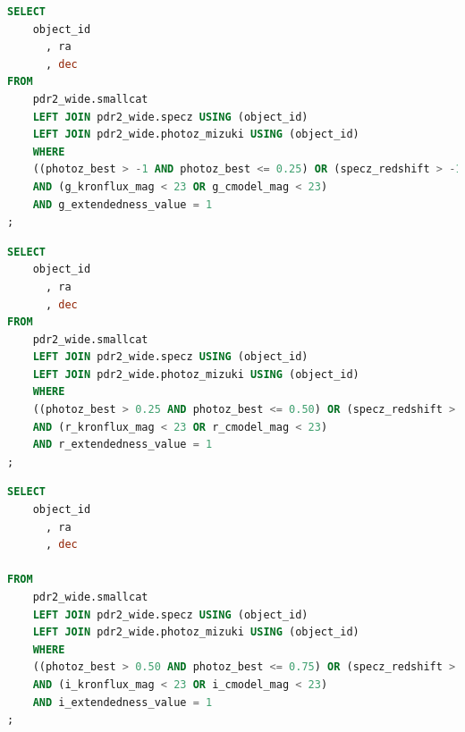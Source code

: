 \begin{lstlisting}[language=SQL, 
    caption={Low-z Sample SQL query}, 
    label={code:sql_low_z}]
SELECT
    object_id
      , ra
      , dec
FROM
    pdr2_wide.smallcat
    LEFT JOIN pdr2_wide.specz USING (object_id)
    LEFT JOIN pdr2_wide.photoz_mizuki USING (object_id)
    WHERE
    ((photoz_best > -1 AND photoz_best <= 0.25) OR (specz_redshift > -1 AND specz_redshift <= 0.25))
    AND (g_kronflux_mag < 23 OR g_cmodel_mag < 23)
    AND g_extendedness_value = 1
;
\end{lstlisting}

\begin{lstlisting}[language=SQL, 
    caption={Mid-z Sample SQL query}, 
    label={code:sql_mid_z}]
SELECT
    object_id
      , ra
      , dec
FROM
    pdr2_wide.smallcat
    LEFT JOIN pdr2_wide.specz USING (object_id)
    LEFT JOIN pdr2_wide.photoz_mizuki USING (object_id)
    WHERE
    ((photoz_best > 0.25 AND photoz_best <= 0.50) OR (specz_redshift > 0.25 AND specz_redshift <= 0.50))
    AND (r_kronflux_mag < 23 OR r_cmodel_mag < 23)
    AND r_extendedness_value = 1
;
\end{lstlisting}


\begin{lstlisting}[language=SQL, 
    caption={High-z Sample SQL query}, 
    label={code:sql_high_z}]
SELECT
    object_id
      , ra
      , dec
      
FROM
    pdr2_wide.smallcat
    LEFT JOIN pdr2_wide.specz USING (object_id)
    LEFT JOIN pdr2_wide.photoz_mizuki USING (object_id)
    WHERE
    ((photoz_best > 0.50 AND photoz_best <= 0.75) OR (specz_redshift > 0.50 AND specz_redshift <= 0.75))
    AND (i_kronflux_mag < 23 OR i_cmodel_mag < 23)
    AND i_extendedness_value = 1
;
\end{lstlisting}




